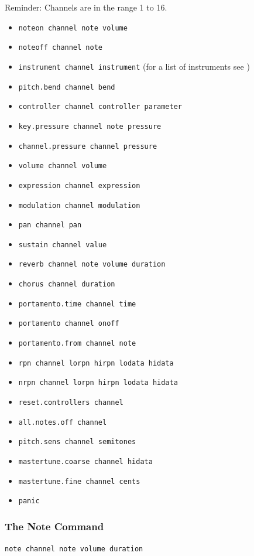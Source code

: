 \documentclass[10pt,a4paper]{article}
\begin{document}
Reminder: Channels are in the range 1 to 16. 
\begin{itemize}
\item \lstinline|noteon channel note volume|
\item \lstinline|noteoff channel note|
\item \lstinline|instrument channel instrument| (for a list of instruments see \cite{midi-inst})	
\item \lstinline|pitch.bend channel bend|
\item \lstinline|controller channel controller parameter|
\item \lstinline|key.pressure channel note pressure|
\item \lstinline|channel.pressure channel pressure|
\item \lstinline|volume channel volume|
\item \lstinline|expression channel expression|
\item \lstinline|modulation channel modulation|
\item \lstinline|pan channel pan|
\item \lstinline|sustain channel value|
\item \lstinline|reverb channel note volume duration|
\item \lstinline|chorus channel duration|
\item \lstinline|portamento.time channel time|
\item \lstinline|portamento channel onoff|
\item \lstinline|portamento.from channel note|
\item \lstinline|rpn channel lorpn hirpn lodata hidata|
\item \lstinline|nrpn channel lorpn hirpn lodata hidata|
\item \lstinline|reset.controllers channel|
\item \lstinline|all.notes.off channel|
\item \lstinline|pitch.sens channel semitones|
\item \lstinline|mastertune.coarse channel hidata|
\item \lstinline|mastertune.fine channel cents|
\item \lstinline|panic|
\end{itemize}

\subsubsection{The Note Command}
\lstinline|note channel note volume duration| \label{note-warning}
\end{document}
